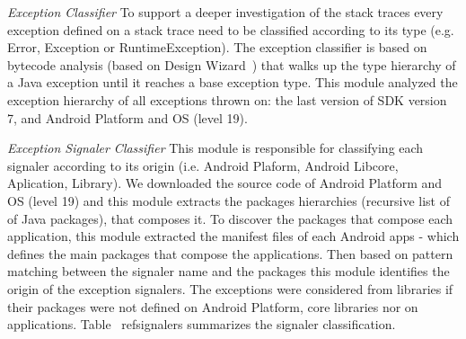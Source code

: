 \documentclass[conference]{IEEEtran}
\begin{document}


\noindent\emph{Exception Classifier} To support a deeper investigation of the stack traces 
every exception defined on a stack trace need to be classified according to its type
(e.g. Error, Exception or RuntimeException). The exception classifier is based on 
bytecode analysis (based on Design Wizard~\cite{Brunet09}) that walks up the 
type hierarchy of a Java exception until it reaches a base exception type.
This module analyzed the exception hierarchy of all exceptions thrown on:
 the last version of SDK version 7, and Android Platform and OS (level 19).


\noindent\emph{Exception Signaler Classifier} 
This module is responsible for classifying each signaler according 
to its origin (i.e. Android Plaform, Android Libcore, Aplication, Library). 
We downloaded the source code of Android Platform and OS (level 19)
and this module extracts the packages hierarchies (recursive list of 
of Java packages), that composes it. To discover the packages that compose 
each application, this module extracted the manifest files of each Android apps
 - which defines the main packages that compose the applications.
Then based on pattern matching between the signaler name and the packages 
 this module identifies the origin of the exception signalers.
The exceptions were considered from libraries if their packages were not defined 
on Android Platform, core libraries nor on applications.
Table ~ref{signalers} summarizes the signaler classification.
\end{document}
